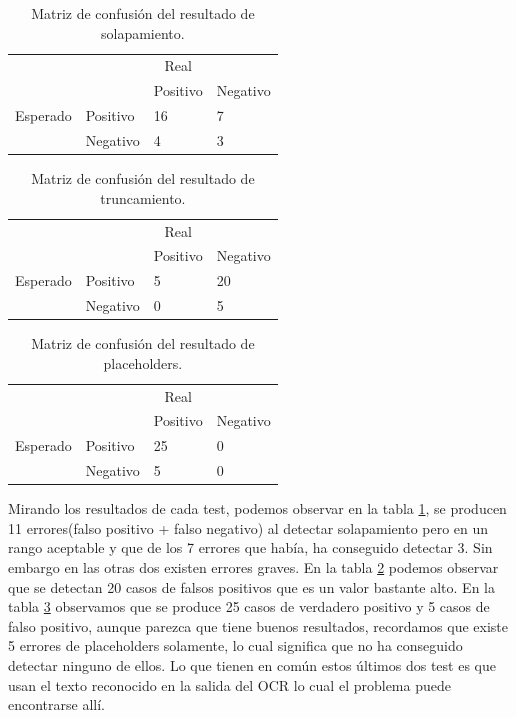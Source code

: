 \begin{table}[H]
		\centering
	\begin{tabular}{llll}
		&          & \multicolumn{1}{c}{Real} &                            \\
		&          & Positivo                 & Negativo                   \\
		Esperado & Positivo & 16  & 7 \\
		& Negativo & 4    & 3                         
	\end{tabular}
	\caption{Matriz de confusión del resultado de solapamiento.}
	\label{table:mt_ori_sol}
\end{table}

\begin{table}[H]
		\centering
	\begin{tabular}{llll}
		&          & \multicolumn{1}{c}{Real} &                            \\
		&          & Positivo                 & Negativo                   \\
		Esperado & Positivo & 5  & 20 \\
		& Negativo & 0    & 5                         
	\end{tabular}
	\caption{Matriz de confusión del resultado de truncamiento.}
	\label{table:mt_ori_trun}
\end{table}

\begin{table}[H]
		\centering
	\begin{tabular}{llll}
		&          & \multicolumn{1}{c}{Real} &                            \\
		&          & Positivo                 & Negativo                   \\
		Esperado & Positivo & 25  & 0 \\
		& Negativo & 5    & 0                         
	\end{tabular}
	\caption{Matriz de confusión del resultado de placeholders.}
	\label{table:mt_ori_place}
\end{table}
Mirando los resultados de cada test, podemos observar en la tabla \ref{table:mt_ori_sol}, se producen 11 errores(falso positivo + falso negativo) al detectar solapamiento pero en un rango aceptable y que de los 7 errores que había, ha conseguido detectar 3. Sin embargo en las otras dos existen errores graves. En la tabla \ref{table:mt_ori_trun} podemos observar que se detectan 20 casos de falsos positivos que es un valor bastante alto. En la tabla \ref{table:mt_ori_place} observamos que se produce 25 casos de verdadero positivo y 5 casos de falso positivo, aunque parezca que tiene buenos resultados, recordamos que existe 5 errores de placeholders solamente, lo cual significa que no ha conseguido detectar ninguno de ellos. 
Lo que tienen en común estos últimos dos test es que usan el texto reconocido en la salida del OCR lo cual el problema puede encontrarse allí.

